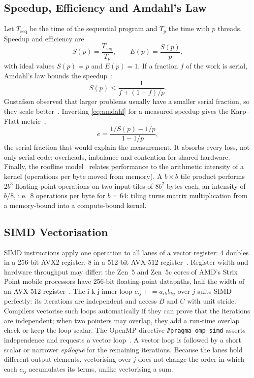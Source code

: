 \documentclass[conference,a4paper]{IEEEtran}
\newcommand{\code}[1]{\texttt{#1}}
\newcommand{\Tseq}{T_{\mathrm{seq}}}
\begin{document}
\subsection{Speedup, Efficiency and Amdahl's Law}
Let $\Tseq$ be the time of the sequential program and $T_p$ the time with $p$
threads. Speedup and efficiency are
\begin{equation}
  S(p) = \frac{\Tseq}{T_p}, \qquad E(p) = \frac{S(p)}{p},
  \label{eq:speedup}
\end{equation}
with ideal values $S(p) = p$ and $E(p) = 1$. If a fraction $f$ of the work is
serial, Amdahl's law bounds the speedup~\cite{amdahl1967}:
\begin{equation}
  S(p) \le \frac{1}{f + (1 - f)/p}.
  \label{eq:amdahl}
\end{equation}
Gustafson observed that larger problems usually have a smaller serial
fraction, so they scale better~\cite{gustafson1988}. Inverting
\eqref{eq:amdahl} for a measured speedup gives the Karp--Flatt
metric~\cite{karp1990},
\begin{equation}
  e = \frac{1/S(p) - 1/p}{1 - 1/p},
  \label{eq:karpflatt}
\end{equation}
the serial fraction that would explain the measurement. It absorbs every loss,
not only serial code: overheads, imbalance and contention for shared hardware.
Finally, the roofline model~\cite{williams2009} relates performance to the
arithmetic intensity of a kernel (operations per byte moved from memory). A
$b \times b$ tile product performs $2b^3$ floating-point operations on two
input tiles of $8b^2$ bytes each, an intensity of $b/8$, i.e.\ 8 operations per
byte for $b = 64$: tiling turns matrix multiplication from a memory-bound into
a compute-bound kernel.

\subsection{SIMD Vectorisation}
SIMD instructions apply one operation to all lanes of a vector register:
4 doubles in a 256-bit AVX2 register, 8 in a 512-bit AVX-512
register~\cite{hennessy2017}. Register width and hardware throughput may
differ: the Zen~5 and Zen~5c cores of AMD's Strix Point mobile processors have
256-bit floating-point datapaths, half the width of an AVX-512
register~\cite{tpu2024}. The i-k-j inner loop
$c_{ij} \mathrel{+}= a_{ik} b_{kj}$ over $j$ suits SIMD perfectly: its
iterations are independent and access $B$ and $C$ with unit stride. Compilers
vectorise such loops automatically if they can prove that the iterations are
independent; when two pointers may overlap, they add a run-time overlap check
or keep the loop scalar. The OpenMP directive \code{\#pragma omp simd} asserts
independence and requests a vector loop~\cite{openmp52}. A vector loop is
followed by a short scalar or narrower \emph{epilogue} for the remaining
iterations. Because the lanes hold different output elements, vectorising over
$j$ does not change the order in which each $c_{ij}$ accumulates its terms,
unlike vectorising a sum.
\end{document}

